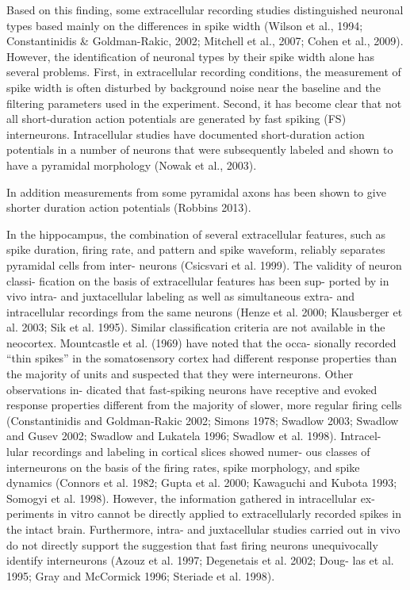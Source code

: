 \documentclass[altfont, fleqn]{uiophd}
\begin{document}
Based on this finding, some extracellular recording
studies distinguished neuronal types based mainly on the differences
in spike width (Wilson et al., 1994; Constantinidis \& Goldman-Rakic,
2002; Mitchell et al., 2007; Cohen et al., 2009).
However, the identification of neuronal types by their spike width
alone has several problems. First, in extracellular recording conditions,
the measurement of spike width is often disturbed by background
noise near the baseline and the filtering parameters used in the
experiment. Second, it has become clear that not all short-duration
action potentials are generated by fast spiking (FS) interneurons.
Intracellular studies have documented short-duration action potentials
in a number of neurons that were subsequently labeled and shown to
have a pyramidal morphology (Nowak et al., 2003).

In addition measurements from some pyramidal axons has been shown
to give shorter duration action potentials (Robbins 2013).

In the hippocampus, the combination of several extracellular
features, such as spike duration, firing rate, and pattern and
spike waveform, reliably separates pyramidal cells from inter-
neurons (Csicsvari et al. 1999). The validity of neuron classi-
fication on the basis of extracellular features has been sup-
ported by in vivo intra- and juxtacellular labeling as well as
simultaneous extra- and intracellular recordings from the same
neurons (Henze et al. 2000; Klausberger et al. 2003; Sik et al.
1995). Similar classification criteria are not available in the
neocortex. Mountcastle et al. (1969) have noted that the occa-
sionally recorded “thin spikes” in the somatosensory cortex
had different response properties than the majority of units and
suspected that they were interneurons. Other observations in-
dicated that fast-spiking neurons have receptive and evoked
response properties different from the majority of slower, more
regular firing cells (Constantinidis and Goldman-Rakic 2002;
Simons 1978; Swadlow 2003; Swadlow and Gusev 2002;
Swadlow and Lukatela 1996; Swadlow et al. 1998). Intracel-
lular recordings and labeling in cortical slices showed numer-
ous classes of interneurons on the basis of the firing rates, spike
morphology, and spike dynamics (Connors et al. 1982; Gupta
et al. 2000; Kawaguchi and Kubota 1993; Somogyi et al.
1998). However, the information gathered in intracellular ex-
periments in vitro cannot be directly applied to extracellularly
recorded spikes in the intact brain. Furthermore, intra- and
juxtacellular studies carried out in vivo do not directly support
the suggestion that fast firing neurons unequivocally identify
interneurons (Azouz et al. 1997; Degenetais et al. 2002; Doug-
las et al. 1995; Gray and McCormick 1996; Steriade et al.
1998).
\end{document}
